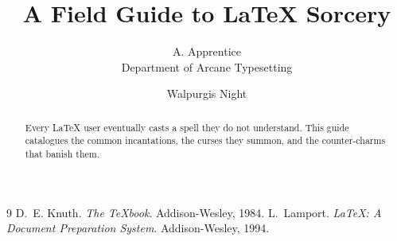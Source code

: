 \documentclass[11pt]{article}
\title{A Field Guide to \LaTeX{} Sorcery}
\author{A. Apprentice \\ \small Department of Arcane Typesetting}
\date{Walpurgis Night}
\begin{document}
\maketitle

\begin{abstract}
Every \LaTeX{} user eventually casts a spell they do not understand. This
guide catalogues the common incantations, the curses they summon, and the
counter-charms that banish them.
\end{abstract}




\begin{thebibliography}{9}
 D.~E. Knuth. \emph{The \TeX book}. Addison-Wesley, 1984.
 L.~Lamport. \emph{\LaTeX: A Document Preparation System}. Addison-Wesley, 1994.
\end{thebibliography}
\end{document}
